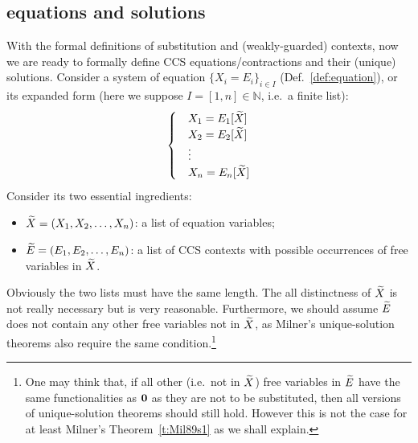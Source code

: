 \subsection{\Multivariate equations and solutions}

With the formal definitions of \multivariate substitution and
\multivariate (weakly-guarded) contexts, now we are ready to formally
define \multivariate CCS equations/contractions and their (unique)
solutions. Consider a system of equation $\{X_i = E_i\}_{i\in I}$
(Def.~\ref{def:equation}), or its expanded form (here we suppose $I = [1,n]
\in \mathbb{N}$, i.e.~a finite list):
\begin{equation*}
  \begin{cases}
    &X_1 = E_1[\widetilde X] \\
    &X_2 = E_2[\widetilde X] \\
    & \vdots \\
    &X_n = E_n[\widetilde X]
  \end{cases}
\end{equation*}
Consider its two essential ingredients:
\begin{itemize}
\item $\widetilde X = (X_1, X_2, \ldots, X_n)$: a list of equation variables;
\item $\widetilde E = (E_1, E_2, \ldots, E_n)$: a list of CCS contexts 
  with possible occurrences of free variables in $\widetilde X$.
\end{itemize}
Obviously the two lists must have the same length. The all
distinctness of $\widetilde X$ is not really necessary but is very
reasonable. Furthermore, we should assume $\widetilde E$ does not contain
any other free variables not in $\widetilde X$, as Milner's unique-solution
theorems also require the same condition.\footnote{One may think that,
  if all other (i.e.~not in $\widetilde X$) free variables in $\widetilde E$ have
  the same functionalities as ${\boldsymbol 0}$ as they are not to be
  substituted, then all versions of unique-solution
  theorems should still hold. However this is not the case for at
  least Milner's Theorem~\ref{t:Mil89s1} as we shall explain.}

